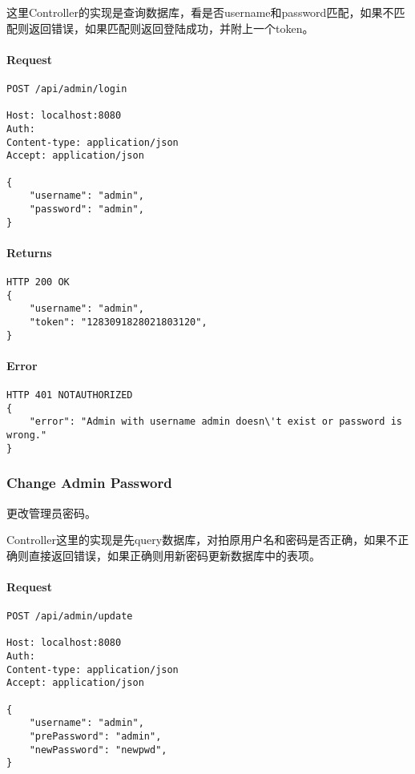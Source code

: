 \documentclass{article}
\begin{document}
这里Controller的实现是查询数据库，看是否username和password匹配，如果不匹配则返回错误，如果匹配则返回登陆成功，并附上一个token。

\paragraph*{Request}
\begin{lstlisting}
POST /api/admin/login

Host: localhost:8080
Auth:
Content-type: application/json
Accept: application/json

{
    "username": "admin",
    "password": "admin",
}
\end{lstlisting}

\paragraph*{Returns}
\begin{lstlisting}
HTTP 200 OK
{
    "username": "admin",
    "token": "1283091828021803120",
}

\end{lstlisting}

\paragraph*{Error}
\begin{lstlisting}
HTTP 401 NOTAUTHORIZED
{
    "error": "Admin with username admin doesn\'t exist or password is wrong."
}
\end{lstlisting}

\subsubsection{Change Admin Password}
更改管理员密码。

Controller这里的实现是先query数据库，对拍原用户名和密码是否正确，如果不正确则直接返回错误，如果正确则用新密码更新数据库中的表项。

\paragraph*{Request}
\begin{lstlisting}
POST /api/admin/update

Host: localhost:8080
Auth:
Content-type: application/json
Accept: application/json

{
    "username": "admin",
    "prePassword": "admin",
    "newPassword": "newpwd",
}
\end{lstlisting}
\end{document}
